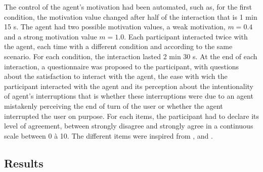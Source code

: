 The control of the agent's motivation had been automated, such as, for the first condition, the motivation value changed after half of the interaction that is 1 min 15 s. The agent had two possible motivation values, a weak motivation, $m=0.4$ and a strong motivation value $m=1.0$. Each participant interacted twice with the agent, each time with a different condition and according to the same scenario. For each condition, the interaction lasted 2 min 30 s. At the end of each interaction, a questionnaire was proposed to the participant, with questions about the satisfaction to interact with the agent, the ease with wich the participant interacted with the agent and its perception about the intentionality of agent's interruptions that is whether these interruptions were due to an agent mistakenly perceiving the end of turn of the user or whether the agent interrupted the user on purpose. 
For each items, the participant had to declare its level of agreement, between strongly disagree and strongly agree in a continuous scale between 0 à 10. The different items were inspired from \cite{skantze_towards_2010}, \cite{bevacqua_effects_2014} and \cite{de_vault_toward_2015}.

\subsection{Results}

